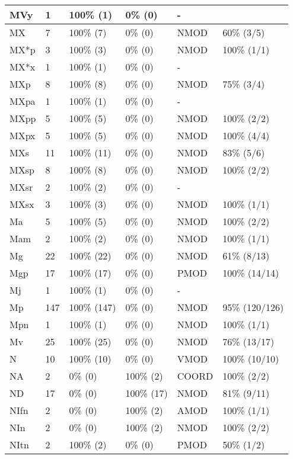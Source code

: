 \begin{figure*}
\begin{tabular}{|l|l|l|l||l|l|}
\hline
 MVy & 1 & 100\% (1) & 0\% (0) & - &  \\ 
\hline
 MX & 7 & 100\% (7) & 0\% (0) & NMOD & 60\% (3/5) \\ 
\hline
 MX*p & 3 & 100\% (3) & 0\% (0) & NMOD & 100\% (1/1) \\ 
\hline
 MX*x & 1 & 100\% (1) & 0\% (0) & - &  \\ 
\hline
 MXp & 8 & 100\% (8) & 0\% (0) & NMOD & 75\% (3/4) \\ 
\hline
 MXpa & 1 & 100\% (1) & 0\% (0) & - &  \\ 
\hline
 MXpp & 5 & 100\% (5) & 0\% (0) & NMOD & 100\% (2/2) \\ 
\hline
 MXpx & 5 & 100\% (5) & 0\% (0) & NMOD & 100\% (4/4) \\ 
\hline
 MXs & 11 & 100\% (11) & 0\% (0) & NMOD & 83\% (5/6) \\ 
\hline
 MXsp & 8 & 100\% (8) & 0\% (0) & NMOD & 100\% (2/2) \\ 
\hline
 MXsr & 2 & 100\% (2) & 0\% (0) & - &  \\ 
\hline
 MXsx & 3 & 100\% (3) & 0\% (0) & NMOD & 100\% (1/1) \\ 
\hline
 Ma & 5 & 100\% (5) & 0\% (0) & NMOD & 100\% (2/2) \\ 
\hline
 Mam & 2 & 100\% (2) & 0\% (0) & NMOD & 100\% (1/1) \\ 
\hline
 Mg & 22 & 100\% (22) & 0\% (0) & NMOD & 61\% (8/13) \\ 
\hline
 Mgp & 17 & 100\% (17) & 0\% (0) & PMOD & 100\% (14/14) \\ 
\hline
 Mj & 1 & 100\% (1) & 0\% (0) & - &  \\ 
\hline
 Mp & 147 & 100\% (147) & 0\% (0) & NMOD & 95\% (120/126) \\ 
\hline
 Mpn & 1 & 100\% (1) & 0\% (0) & NMOD & 100\% (1/1) \\ 
\hline
 Mv & 25 & 100\% (25) & 0\% (0) & NMOD & 76\% (13/17) \\ 
\hline
 N & 10 & 100\% (10) & 0\% (0) & VMOD & 100\% (10/10) \\ 
\hline
 NA & 2 & 0\% (0) & 100\% (2) & COORD & 100\% (2/2) \\ 
\hline
 ND & 17 & 0\% (0) & 100\% (17) & NMOD & 81\% (9/11) \\ 
\hline
 NIfn & 2 & 0\% (0) & 100\% (2) & AMOD & 100\% (1/1) \\ 
\hline
 NIn & 2 & 0\% (0) & 100\% (2) & NMOD & 100\% (2/2) \\ 
\hline
 NItn & 2 & 100\% (2) & 0\% (0) & PMOD & 50\% (1/2) \\ 
\hline
\end{tabular}
\end{figure*}

